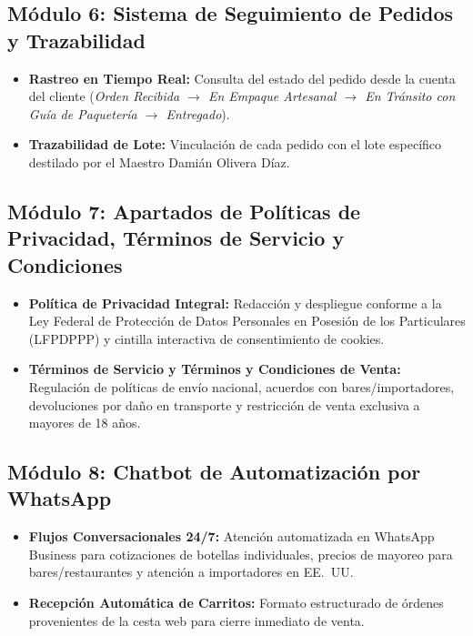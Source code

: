 \documentclass[11pt,letterpaper]{article}
\begin{document}
\subsection{Módulo 6: Sistema de Seguimiento de Pedidos y Trazabilidad}
\begin{itemize}[leftmargin=1.5cm]
    \item \textbf{Rastreo en Tiempo Real:} Consulta del estado del pedido desde la cuenta del cliente (\textit{Orden Recibida $\rightarrow$ En Empaque Artesanal $\rightarrow$ En Tránsito con Guía de Paquetería $\rightarrow$ Entregado}).
    \item \textbf{Trazabilidad de Lote:} Vinculación de cada pedido con el lote específico destilado por el Maestro Damián Olivera Díaz.
\end{itemize}

\subsection{Módulo 7: Apartados de Políticas de Privacidad, Términos de Servicio y Condiciones}
\begin{itemize}[leftmargin=1.5cm]
    \item \textbf{Política de Privacidad Integral:} Redacción y despliegue conforme a la Ley Federal de Protección de Datos Personales en Posesión de los Particulares (LFPDPPP) y cintilla interactiva de consentimiento de cookies.
    \item \textbf{Términos de Servicio y Términos y Condiciones de Venta:} Regulación de políticas de envío nacional, acuerdos con bares/importadores, devoluciones por daño en transporte y restricción de venta exclusiva a mayores de 18 años.
\end{itemize}

\subsection{Módulo 8: Chatbot de Automatización por WhatsApp}
\begin{itemize}[leftmargin=1.5cm]
    \item \textbf{Flujos Conversacionales 24/7:} Atención automatizada en WhatsApp Business para cotizaciones de botellas individuales, precios de mayoreo para bares/restaurantes y atención a importadores en EE.~UU.
    \item \textbf{Recepción Automática de Carritos:} Formato estructurado de órdenes provenientes de la cesta web para cierre inmediato de venta.
\end{itemize}
\end{document}
